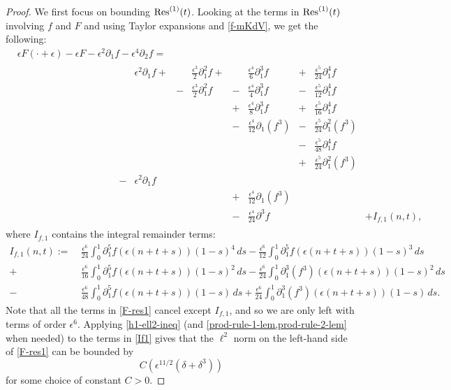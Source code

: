 \begin{proof}
	We first focus on bounding \(\mathrm{Res}^{(1)}(t)\). Looking at the terms in \(\mathrm{Res}^{(1)}(t)\) involving \(f\) and \(F\) and using Taylor expansions and \cref{f-mKdV}, we get the following:
	\begin{equation}\label{F-res1}
		\begin{aligned}
			&\epsilon F(\cdot + \epsilon) - \epsilon F - \epsilon^2 \partial_1 f - \epsilon^4 \partial_2 f = \\
			&\hspace{10em}\begin{aligned}
				&\epsilon^2 \partial_1 f + & & \frac{\epsilon^3} 2 \partial_1^2 f +& &\frac{\epsilon^4} 6 \partial_1^3 f   & + &\frac{\epsilon^5}{24} \partial_1^4 f  \\
				& & - &\frac{\epsilon^3} 2 \partial_1^2 f & - &\frac{\epsilon^4} 4 \partial_1^3 f & - & \frac{\epsilon^5} {12} \partial_1^4 f \\
				& & & & + &\frac {\epsilon^4} 8 \partial_1^3 f & + & \frac{\epsilon^5}{16} \partial_1^4 f   \\
				& & & & - &\frac {\epsilon^4} {12} \partial_1 (f^3) & - & \frac{\epsilon^5}{24} \partial_1^2(f^3)\\
				& & & & & & - & \frac{\epsilon^5}{48} \partial_1^4 f \\
				& & & & & & + & \frac{\epsilon^5}{24} \partial_1^2 (f^3) \\
				-&\epsilon^2 \partial_1 f \\
				& & & & + &\frac{\epsilon^4}{12}\partial_1(f^3) \\
				& & & & - &\frac{\epsilon^4}{24}\partial^3 f & & & + I_{f,1}(n,t),
			\end{aligned}
		\end{aligned}
	\end{equation}
	where \(I_{f,1}\) contains the integral remainder terms:
	\begin{equation}\label{If1}
	\begin{aligned}
		I_{f,1}(n,t) := \ &\frac{\epsilon^6} {24} \int_0^1 \partial_1^5 f(\epsilon(n+t+s))(1-s)^4\, ds - \frac{\epsilon^6} {12} \int_0^1 \partial_1^5 f(\epsilon(n+t+s))(1-s)^3\, ds \\
		+ & \frac{\epsilon^6} {16} \int_0^1 \partial_1^5 f(\epsilon(n+t+s))(1-s)^2\, ds -  \frac{\epsilon^6} {24} \int_0^1 \partial_1^3 (f^3)(\epsilon(n+t+s))(1-s)^2\, ds \\
		- & \frac{\epsilon^6}{48} \int_0^1 \partial_1^5f(\epsilon(n+t+s))(1-s)\, ds +  \frac{\epsilon^6}{24} \int_0^1 \partial_1^3 (f^3)(\epsilon(n+t+s)) (1-s)\, ds.
	\end{aligned}
	\end{equation}
	Note that all the terms in \cref{F-res1} cancel except \(I_{f,1}\), and so we are only left with terms of order \(\epsilon^6\). Applying \cref{h1-ell2-ineq} (and \cref{prod-rule-1-lem,prod-rule-2-lem} when needed) to the terms in \cref{If1} gives that the \(\ell^2\) norm on the left-hand side of \cref{F-res1} can be bounded by \[C(\epsilon^{11/2}(\delta + \delta^3))\] for some choice of constant \(C>0\).
	

\end{proof}
